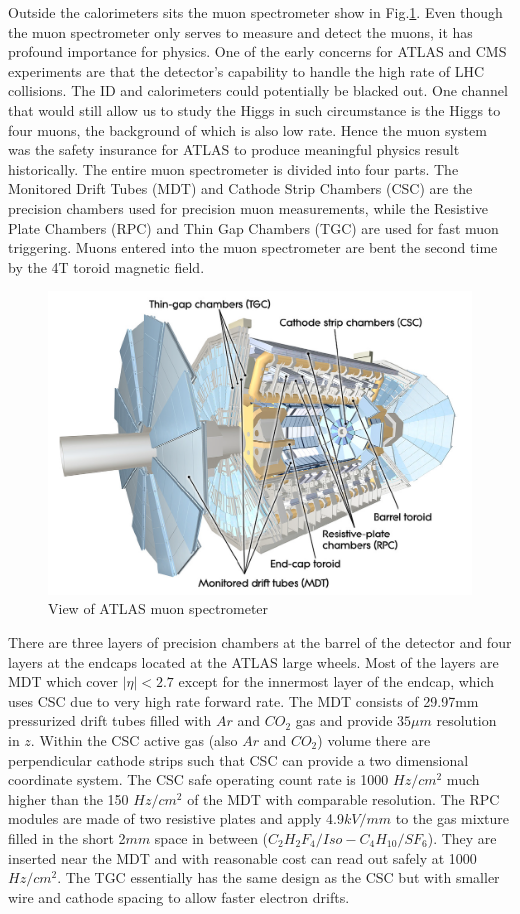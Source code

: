 \label{sec:detector-mu}
Outside the calorimeters sits the muon spectrometer show in Fig.\ref{fig:detector-mu}. Even though the muon spectrometer only serves to measure and detect the muons, it has profound importance for physics. One of the early concerns for ATLAS and CMS experiments are that the detector's capability to handle the high rate of LHC collisions. The ID and calorimeters could potentially be blacked out. One channel that would still allow us to study the Higgs in such circumstance is the Higgs to four muons, the background of which is also low rate. Hence the muon system was the safety insurance for ATLAS to produce meaningful physics result historically. The entire muon spectrometer is divided into four parts\cite{ATLASDetector}. The Monitored Drift Tubes (MDT) and Cathode Strip Chambers (CSC) are the precision chambers used for precision muon measurements, while the Resistive Plate Chambers (RPC) and Thin Gap Chambers (TGC) are used for fast muon triggering. Muons entered into the muon spectrometer are bent the second time by the 4T toroid magnetic field. 

\begin{figure}[htpb!]
\begin{center}
  \includegraphics[width=0.8\linewidth]{figures/detector/muon}
\caption{View of ATLAS muon spectrometer}
\label{fig:detector-mu}
\end{center}
\end{figure}


There are three layers of precision chambers at the barrel of the detector and four layers at the endcaps located at the ATLAS large wheels. Most of the layers are MDT which cover $|\eta|<2.7$ except for the innermost layer of the endcap, which uses CSC due to very high rate forward rate. The MDT consists of 29.97mm pressurized drift tubes filled with $Ar$ and $CO_2$ gas and provide $35\mu m$ resolution in $z$. Within the CSC active gas (also $Ar$ and $CO_2$) volume there are perpendicular cathode strips such that CSC can provide a two dimensional coordinate system. The CSC safe operating count rate is 1000 $Hz/cm^2$ much higher than the 150 $Hz/cm^2$ of the MDT with comparable resolution. The RPC modules are made of two resistive plates and apply 4.9$kV/mm$ to the gas mixture filled in the short 2$mm$ space in between ($C_2H_2F_4/Iso-C_4H_{10}/SF_6$). They are inserted near the MDT and with reasonable cost can read out safely at 1000 $Hz/cm^2$. The TGC essentially has the same design as the CSC but with smaller wire and cathode spacing to allow faster electron drifts. 

